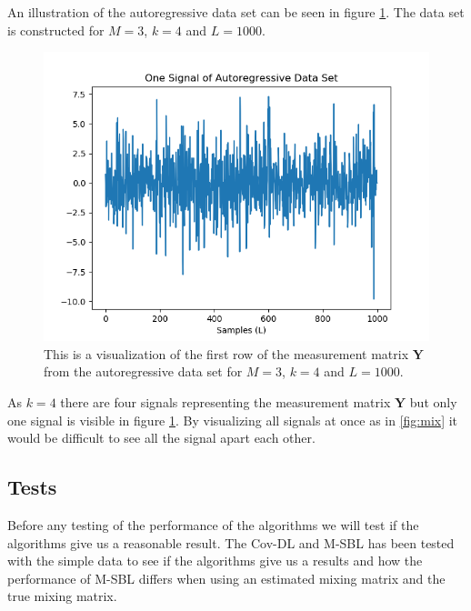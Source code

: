 An illustration of the autoregressive data set can be seen in figure \ref{fig:AR}. The data set is constructed for $M = 3$, $k = 4$ and $L = 1000$.
\begin{figure}[H]
\centering
\includegraphics[scale=0.5]{figures/chapter6/AR_Data_m3_n4_k4_L1000.png}
\caption{This is a visualization of the first row of the measurement matrix $\mathbf{Y}$ from the autoregressive data set for $M = 3$, $k=4$ and $L=1000$.}
\label{fig:AR}
\end{figure}
\noindent
As $k = 4$ there are four signals representing the measurement matrix $\mathbf{Y}$ but only one signal is visible in figure \ref{fig:AR}. By visualizing all signals at once as in \ref{fig:mix} it would be difficult to see all the signal apart each other.

\subsection{Tests}

Before any testing of the performance of the algorithms we will test if the algorithms give us a reasonable result. The Cov-DL and M-SBL has been tested with the simple data to see if the algorithms give us a results and how the performance of M-SBL differs when using an estimated mixing matrix and the true mixing matrix.

